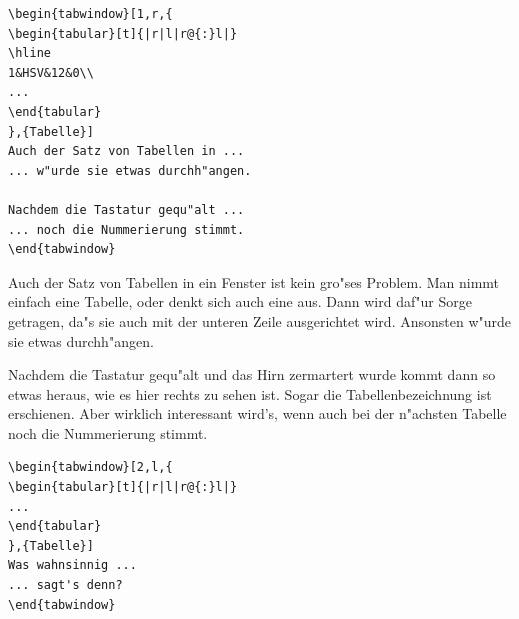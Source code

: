 \documentclass[a4paper]{article}
\begin{document}
\begin{verbatim}
\begin{tabwindow}[1,r,{
\begin{tabular}[t]{|r|l|r@{:}l|}
\hline
1&HSV&12&0\\
...
\end{tabular}
},{Tabelle}]
Auch der Satz von Tabellen in ...
... w"urde sie etwas durchh"angen.

Nachdem die Tastatur gequ"alt ...
... noch die Nummerierung stimmt.
\end{tabwindow}
\end{verbatim}

Auch der Satz von Tabellen in ein Fenster ist kein gro"ses Problem.
Man nimmt einfach eine Tabelle, oder denkt sich auch eine aus.
Dann wird daf"ur Sorge getragen, da"s sie auch mit der unteren
Zeile ausgerichtet wird. Ansonsten w"urde sie etwas durchh"angen.

Nachdem die Tastatur gequ"alt und das Hirn zermartert wurde kommt
dann so etwas heraus, wie es hier rechts zu sehen ist. Sogar die
Tabellenbezeichnung ist erschienen. Aber wirklich interessant wird's,
wenn auch bei der n"achsten Tabelle noch die Nummerierung stimmt.
\end{tabwindow}

\begin{verbatim}
\begin{tabwindow}[2,l,{
\begin{tabular}[t]{|r|l|r@{:}l|}
...
\end{tabular}
},{Tabelle}]
Was wahnsinnig ...
... sagt's denn?
\end{tabwindow}
\end{verbatim}
\end{document}
